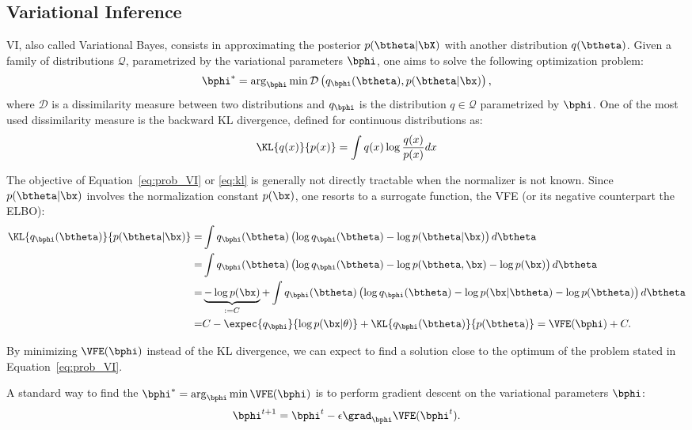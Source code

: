 \subsection{Variational Inference}
\label{sec:vi}
\acf{VI}, also called Variational Bayes, consists in approximating the posterior $p(\btheta|\bX)$ with another distribution $q(\btheta)$.
Given a family of distributions $\mathcal{Q}$, parametrized by the variational parameters $\bphi$, one aims to solve the following optimization problem:
\begin{align}
\bphi^* = \arg_{\bphi}\min \mathcal{D}\left(q_{\bphi}(\btheta), p(\btheta|\bx)\right),
\label{eq:prob_VI}
\end{align}
where $\mathcal{D}$ is a dissimilarity measure between two distributions and $q_{\bphi}$ is the distribution $q\in \mathcal{Q}$ parametrized by $\bphi$.
One of the most used dissimilarity measure is the backward \ac{KL} divergence, defined for continuous distributions as:
\begin{align}
\KL{q(x)}{p(x)} = \int q(x) \log \frac{q(x)}{p(x)}dx
\label{eq:kl}
\end{align}

The objective of Equation~\eqref{eq:prob_VI} or \eqref{eq:kl} is generally not directly tractable when the normalizer is not known.
Since $p(\btheta|\bx)$ involves the normalization constant $p(\bx)$, one resorts to a surrogate function, the \ac{VFE} (or its negative counterpart the \ac{ELBO}):
\begin{align}
\KL{q_{\bphi}(\btheta)}{p(\btheta|\bx)} =& \int q_{\bphi}(\btheta) \left(\log q_{\bphi}(\btheta) - \log p(\btheta|\bx)\right)d\btheta\nonumber\\
=&\int q_{\bphi}(\btheta) \left(\log q_{\bphi}(\btheta) - \log p(\btheta, \bx) - \log p(\bx)\right)d\btheta\nonumber\\
=&\underbrace{- \log p(\bx)}_{:=C} + \int q_{\bphi}(\btheta) \left(\log q_{\bphi}(\btheta) - \log p(\bx|\btheta)- \log p(\btheta) \right)d\btheta\nonumber\\
=& C -\expec{q_{\bphi}}{\log p(\bx|\theta)} + \KL{q_{\bphi}(\btheta)}{p(\btheta)} = \VFE(\bphi) + C.\label{eq:vfe}
\end{align}


By minimizing $\VFE(\bphi)$ instead of the \ac{KL} divergence, we can expect to find a solution close to the optimum of the problem stated in Equation~\eqref{eq:prob_VI}.

A standard way to find the $\bphi^* = \arg_{\bphi}\min \VFE(\bphi)$ is to perform gradient descent on the variational parameters $\bphi$:
\begin{align}
\bphi^{t+1} = \bphi^{t} - \epsilon \grad_{\bphi}\VFE(\bphi^{t}).
\label{eq:vigraddescent}
\end{align}

